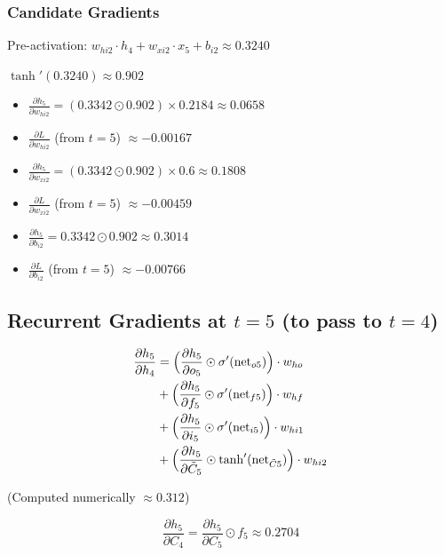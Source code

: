 \documentclass[12pt]{article}
\begin{document}
\subsubsection*{Candidate Gradients}

Pre-activation: $w_{hi2} \cdot h_4 + w_{xi2} \cdot x_5 + b_{i2} \approx 0.3240$

$\tanh'(0.3240) \approx 0.902$

\begin{itemize}[leftmargin=*]
    \item $\frac{\partial h_5}{\partial w_{hi2}} = (0.3342 \odot 0.902) \times 0.2184 \approx 0.0658$
    \item $\frac{\partial L}{\partial w_{hi2}}$ (from $t=5$) $\approx -0.00167$

    \item $\frac{\partial h_5}{\partial w_{xi2}} = (0.3342 \odot 0.902) \times 0.6 \approx 0.1808$
    \item $\frac{\partial L}{\partial w_{xi2}}$ (from $t=5$) $\approx -0.00459$

    \item $\frac{\partial h_5}{\partial b_{i2}} = 0.3342 \odot 0.902 \approx 0.3014$
    \item $\frac{\partial L}{\partial b_{i2}}$ (from $t=5$) $\approx -0.00766$
\end{itemize}

\subsection*{Recurrent Gradients at $t=5$ (to pass to $t=4$)}

\begin{align*}
\frac{\partial h_5}{\partial h_4} &=
\Bigl( \frac{\partial h_5}{\partial o_5} \odot \sigma'(\text{net}_{o5}) \Bigr) \cdot w_{ho} \\
&+ \Bigl( \frac{\partial h_5}{\partial f_5} \odot \sigma'(\text{net}_{f5}) \Bigr) \cdot w_{hf} \\
&+ \Bigl( \frac{\partial h_5}{\partial i_5} \odot \sigma'(\text{net}_{i5}) \Bigr) \cdot w_{hi1} \\
&+ \Bigl( \frac{\partial h_5}{\partial \tilde{C}_5} \odot \tanh'(\text{net}_{\tilde{C}5}) \Bigr) \cdot w_{hi2}
\end{align*}

(Computed numerically $\approx 0.312$)

\begin{equation*}
\frac{\partial h_5}{\partial C_4} = \frac{\partial h_5}{\partial C_5} \odot f_5 \approx 0.2704
\end{equation*}
\end{document}

